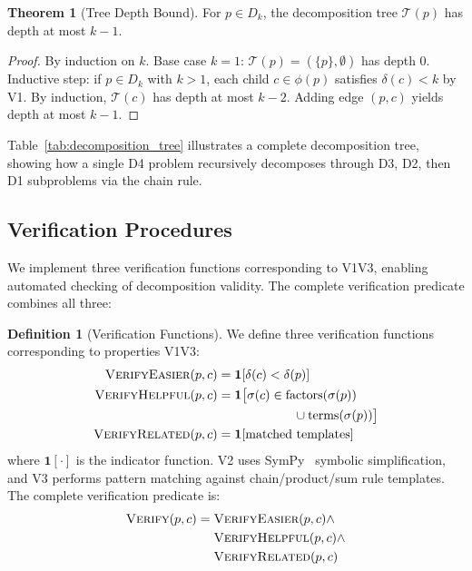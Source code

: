 \documentclass[a4paper,fleqn]{cas-dc}
\theoremstyle{definition}
\newtheorem{definition}{Definition}
\newtheorem{theorem}{Theorem}
\begin{document}
\begin{theorem}[Tree Depth Bound]
\label{thm:tree_depth}
For $p \in D_k$, the decomposition tree $\mathcal{T}(p)$ has depth at most $k - 1$.
\end{theorem}

\begin{proof}
By induction on $k$. Base case $k = 1$: $\mathcal{T}(p) = (\{p\}, \emptyset)$ has depth 0. Inductive step: if $p \in D_k$ with $k > 1$, each child $c \in \phi(p)$ satisfies $\delta(c) < k$ by V1. By induction, $\mathcal{T}(c)$ has depth at most $k - 2$. Adding edge $(p, c)$ yields depth at most $k - 1$.
\end{proof}

\noindent
Table~\ref{tab:decomposition_tree} illustrates a complete decomposition tree, showing how a single D4 problem recursively decomposes through D3, D2, then D1 subproblems via the chain rule.

\subsection{Verification Procedures}
\label{sec:verification}
We implement three verification functions corresponding to V1\textendash V3, enabling automated checking of decomposition validity. The complete verification predicate combines all three:

\begin{definition}[Verification Functions]
\label{def:verify}
We define three verification functions corresponding to properties V1\textendash V3:
\begin{align}
\textsc{VerifyEasier}(p, c) &= \mathbf{1}[\delta(c) < \delta(p)] \\
\textsc{VerifyHelpful}(p, c) &= \mathbf{1}\big[\sigma(c) \in \text{factors}(\sigma(p)) \notag \\
&\qquad\qquad\qquad \cup \text{terms}(\sigma(p))\big] \\
\textsc{VerifyRelated}(p, c) &= \mathbf{1}[\text{matched templates}]
\end{align}
where $\mathbf{1}[\cdot]$ is the indicator function. V2 uses SymPy~\cite{sympy} symbolic simplification, and V3 performs pattern matching against chain/product/sum rule templates. The complete verification predicate is:
\begin{equation}
\begin{aligned}
\textsc{Verify}(p, c) = {} & \textsc{VerifyEasier}(p, c) \land \\
& \textsc{VerifyHelpful}(p, c) \land \\
& \textsc{VerifyRelated}(p, c)
\end{aligned}
\end{equation}
\end{definition}
\end{document}
